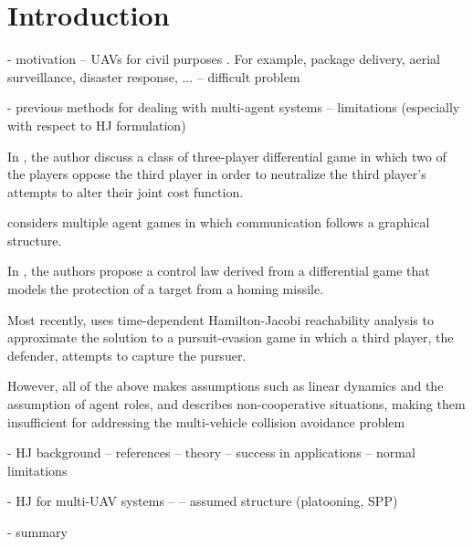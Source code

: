 \section{Introduction}
- motivation
-- UAVs for civil purposes \cite{Tice91, Debusk10, FAA13, AUVSI16, Amazon16, BBC16, NASA16}. For example, package delivery, aerial surveillance, disaster response, ...
-- difficult problem

- previous methods for dealing with multi-agent systems
-- limitations (especially with respect to HJ formulation)

In \cite{Tanimoto78}, the author discuss a class of three-player differential game in which two of the players oppose the third player in order to neutralize the third player's attempts to alter their joint cost function.

\cite{Lin13} considers multiple agent games in which communication follows a graphical structure. 

In \cite{Su14}, the authors propose a control law derived from a differential game that models the protection of a target from a homing missile.

Most recently, \cite{Fisac15} uses time-dependent Hamilton-Jacobi reachability analysis to approximate the solution to a pursuit-evasion game in which a third player, the defender, attempts to capture the pursuer.

However, all of the above makes assumptions such as linear dynamics and the assumption of agent roles, and describes non-cooperative situations, making them insufficient for addressing the multi-vehicle collision avoidance problem

- HJ background
-- references
-- theory \cite{Mitchell05}
-- success in applications \cite{Ding08, Chen14}
-- normal limitations

- HJ for multi-UAV systems
-- \cite{Chen15, Chen15b, Chen16}
-- assumed structure (platooning, SPP)

- summary